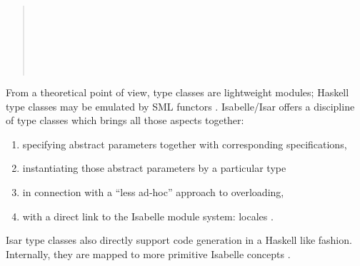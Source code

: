 \begin{isabellebody}
\begin{isamarkuptext}
  \begin{quote}

  \noindent{} \\
  \hspace*{2ex} \\
   \\
  \hspace*{2ex} \\
  \hspace*{2ex} \\
  \hspace*{2ex}

  \end{quote}

  \noindent From a theoretical point of view, type classes are
  lightweight modules; Haskell type classes may be emulated by SML
  functors \cite{classes_modules}.  Isabelle/Isar offers a discipline
  of type classes which brings all those aspects together:

  \begin{enumerate}
    \item specifying abstract parameters together with
       corresponding specifications,
    \item instantiating those abstract parameters by a particular
       type
    \item in connection with a ``less ad-hoc'' approach to overloading,
    \item with a direct link to the Isabelle module system:
      locales \cite{kammueller-locales}.
  \end{enumerate}

  \noindent Isar type classes also directly support code generation in
  a Haskell like fashion. Internally, they are mapped to more
  primitive Isabelle concepts \cite{Haftmann-Wenzel:2006:classes}.


\end{isamarkuptext}
\end{isabellebody}
